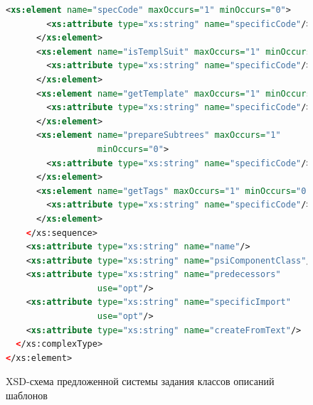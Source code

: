 \begin{figure}[H]
    \begin{lstlisting}[language=xml]
      <xs:element name="specCode" maxOccurs="1" minOccurs="0">
        <xs:attribute type="xs:string" name="specificCode"/>
      </xs:element>
      <xs:element name="isTemplSuit" maxOccurs="1" minOccurs="0">
        <xs:attribute type="xs:string" name="specificCode"/>
      </xs:element>
      <xs:element name="getTemplate" maxOccurs="1" minOccurs="0">
        <xs:attribute type="xs:string" name="specificCode"/>
      </xs:element>
      <xs:element name="prepareSubtrees" maxOccurs="1" 
                  minOccurs="0">
        <xs:attribute type="xs:string" name="specificCode"/>
      </xs:element>
      <xs:element name="getTags" maxOccurs="1" minOccurs="0">
        <xs:attribute type="xs:string" name="specificCode"/>
      </xs:element>
    </xs:sequence>
    <xs:attribute type="xs:string" name="name"/>
    <xs:attribute type="xs:string" name="psiComponentClass"/>
    <xs:attribute type="xs:string" name="predecessors" 
                  use="opt"/>
    <xs:attribute type="xs:string" name="specificImport" 
                  use="opt"/>
    <xs:attribute type="xs:string" name="createFromText"/>
  </xs:complexType>
</xs:element>
    \end{lstlisting}
\caption{XSD-схема предложенной системы задания классов описаний шаблонов}    
\label{XSD-scheme}
\end{figure}

